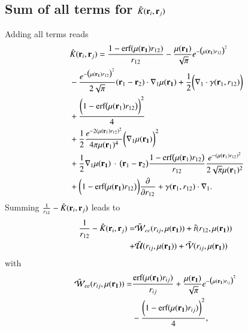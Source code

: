 \documentclass[aip,jcp,reprint,noshowkeys,superscriptaddress]{revtex4-1}
\newcommand{\deriv}[3]{\frac{\partial^{#3} #1}{\partial {#2}^{#3}}}
\newcommand{\br}[0]{{\bf {r}}}
\newcommand{\bri}[1]{{\bf r}_{#1}}
\newcommand{\mur}[1]{\mu({\bf r_{#1}})}
\begin{document}
\subsection{Sum of all terms for $\hat{K}(\bri{i},\bri{j})$ }
Adding all terms reads 
\begin{equation}
 \begin{aligned}
 &\hat{K}(\bri{i},\bri{j}) =  \frac{1 - \text{erf}(\mur{1} r_{12})}{r_{12}} - \frac{\mur{1}}{\sqrt{\pi}} e^{-\big(\mur{1} r_{12} \big)^2} \\
 & -\frac{e^{-\big( \mur{1} r_{12}\big)^2}}{2 \sqrt{\pi}}(\br_1 - \br_2) \cdot \nabla_1 \mur{1} + \frac{1}{2}\bigg(\nabla_1 \cdot {\bf \gamma}(\br_1, r_{12})\bigg) \\
 &  +  \frac{\bigg(1 - \text{erf}\big(\mu(\bri{1}) r_{12} \big)\bigg)^2}{4} \\
 &  +  \frac{1}{2}\frac{e^{-2(\mu(\bri{1}) r_{12})^2}}{4 \pi \mu(\bri{1})^4} \bigg( \nabla_1  \mur{1}\bigg)^2 \\ 
 &  +  \frac{1}{2} \nabla_1  \mur{1} \, \cdot \, \big( \br{}_1 - \br{}_2\big) \frac{1 - \text{erf}\big(\mu(\bri{1}) r_{12} \big)}{r_{12}} \frac{e^{-(\mu(\bri{1}) r_{12})^2}}{2 \sqrt{\pi}\mu(\bri{1})^2} \\ 
 &  + \bigg( 1 - \text{erf}\big(\mur{1} r_{12} \big) \bigg) \deriv{}{r_{12}}{} + {\bf \gamma}(\br_1, r_{12}) \cdot \nabla_1. 
 \end{aligned}
\end{equation}
Summing $\frac{1}{r_{12}} - \hat{K}(\bri{i},\bri{j})$ leads to 
\begin{equation}
 \begin{aligned}
  \frac{1}{r_{12}} - \hat{K}(\bri{i},\bri{j}) = & \tilde{\mathcal{W}}_{ee}(r_{ij},\mur{1}) + \tilde{t}(r_{12},\mur{1}) \\ 
                                              + & \tilde{\mathcal{U}}(r_{ij},\mur{1})
                                              +  \tilde{\mathcal{V}}(r_{ij},\mur{1})
 \end{aligned}
\end{equation}
with 
\begin{equation}
 \begin{aligned}
 \tilde{\mathcal{W}}_{ee}(r_{ij},\mur{1})  =  & \frac{\text{erf}(\mur{1} r_{ij})}{r_{ij}} 
  + \frac{\mur{1}}{\sqrt{\pi}} e^{-\big(\mur{1} r_{ij} \big)^2} \\
 & - \frac{\bigg(1 -  \text{erf}(\mur{1} r_{ij}) \bigg)^2}{4}, 
 \end{aligned}
\end{equation}
\end{document}
